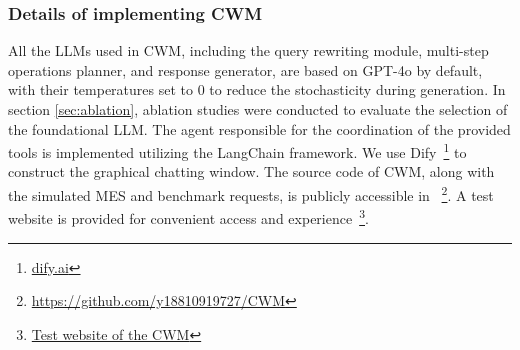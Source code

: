 \documentclass[preprint,12pt]{elsarticle}
\begin{document}
\subsubsection{Details of implementing CWM}
All the LLMs used in CWM, including the query rewriting module, multi-step operations planner, and response generator, are based on GPT-4o by default, with their temperatures set to 0 to reduce the stochasticity during generation.
In section \ref{sec:ablation}, ablation studies were conducted to evaluate the selection of the foundational LLM. 
The agent responsible for the coordination of the provided tools is implemented utilizing the LangChain framework. 
We use Dify~\footnote{\href{https://github.com/langgenius/dify}{dify.ai}} to construct the graphical chatting window.
The source code of CWM, along with the simulated MES and benchmark requests, is publicly accessible in ~\footnote{\href{https://github.com/y18810919727/CWM}{https://github.com/y18810919727/CWM}}.
A test website is provided for convenient access and experience~\footnote{\href{https://dify.ai-fashion.cn/chat/muYb1xmFOw50PPWM}{Test website of the CWM}}.






\end{document}
